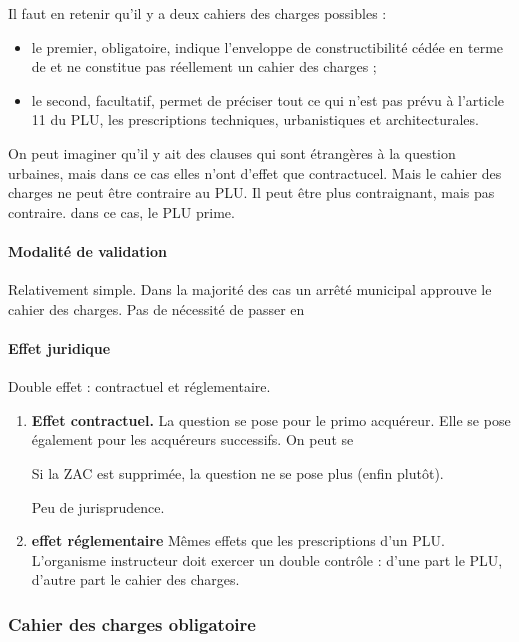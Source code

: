 		Il faut en retenir qu'il y a deux cahiers des charges possibles :
		\begin{itemize}
			\item le premier, obligatoire, indique l'enveloppe de constructibilité cédée en terme de \sdp et ne constitue pas réellement un cahier des charges ;
			\item le second, facultatif, permet de préciser tout ce qui n'est pas prévu à l'article 11 du PLU, les prescriptions techniques, urbanistiques et architecturales.
		\end{itemize}

	On peut imaginer qu'il y ait des clauses qui sont étrangères à la question urbaines, mais dans ce cas elles n'ont d'effet que contractucel. Mais le cahier des charges ne peut être contraire au PLU. Il peut être plus contraignant, mais pas contraire. dans ce cas, le PLU prime.

	\paragraph{Modalité de validation} Relativement simple. Dans la majorité des cas un arrêté municipal approuve le cahier des charges. Pas de nécessité de passer en \CM

	\paragraph{Effet juridique} Double effet : contractuel et réglementaire.

	\begin{enumerate}
		\item \textbf{Effet contractuel.} La question se pose pour le primo acquéreur. Elle se pose également pour les acquéreurs successifs. On peut se

		Si la ZAC est supprimée, la question ne se pose plus (enfin plutôt).

		Peu de jurisprudence.

		\item \textbf{effet réglementaire} Mêmes effets que les prescriptions d'un PLU. L'organisme instructeur doit exercer un double contrôle : d'une part le PLU, d'autre part le cahier des charges.
	\end{enumerate}



		\subsubsection{Cahier des charges obligatoire}

